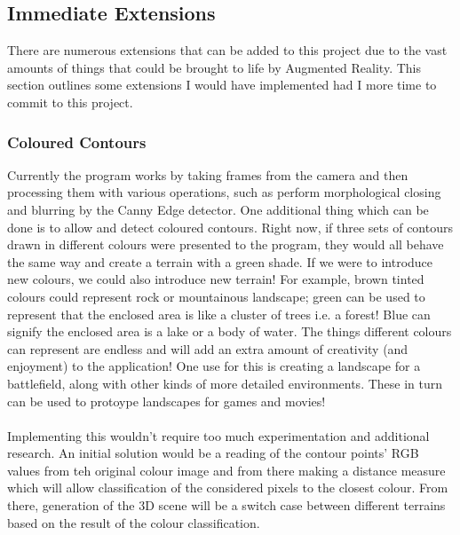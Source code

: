 \documentclass[11pt]{article}
\begin{document}
\subsection{Immediate Extensions}
There are numerous extensions that can be added to this project due to the 
vast amounts of things that could be brought to life by Augmented Reality.
This section outlines some extensions I would have implemented had I
more time to commit to this project.

\subsubsection{Coloured Contours}
Currently the program works by taking frames from the camera and then   
processing them with various operations, such as perform morphological
closing and blurring by the Canny Edge detector. One additional thing 
which can be done is to allow and detect coloured contours. Right now,
if three sets of contours drawn in different colours were presented to
the program, they would all behave the same way and create a terrain
with a green shade. If we were to introduce new colours, we could also
introduce new terrain! For example, brown tinted colours could represent
rock or mountainous landscape; green can be used to represent that the 
enclosed area is like a cluster of trees i.e. a forest! Blue can signify
the enclosed area is a lake or a body of water. The things different
colours can represent are endless and will add an extra amount of creativity
(and enjoyment) to the application! One use for this is creating a 
landscape for a battlefield, along with other kinds of more 
detailed environments. These in turn can be used to protoype 
landscapes for games and movies!\\
\\
Implementing this wouldn't require too much experimentation and
additional research. An initial solution would be a
reading of the contour points' RGB values from teh original colour image
and from there making a distance 
measure which will allow classification of the considered pixels to the 
closest colour. From there, generation of the 3D scene will be a switch case 
between different terrains based on the result of the colour classification.
\end{document}
